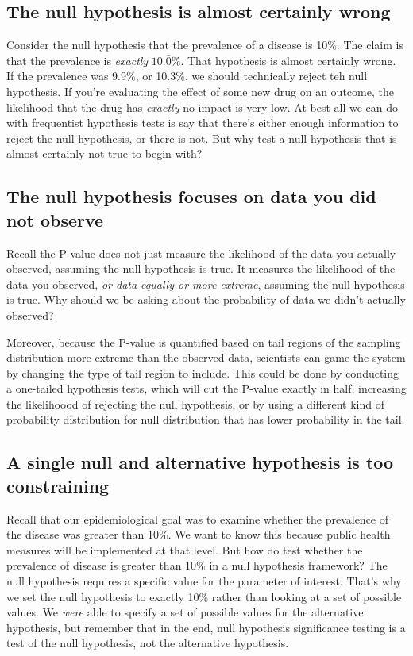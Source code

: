 \documentclass[
]{book}
\begin{document}
\subsection{The null hypothesis is almost certainly wrong}\label{the-null-hypothesis-is-almost-certainly-wrong}

Consider the null hypothesis that the prevalence of a disease is 10\%. The claim is that the prevalence is \emph{exactly} \(10.\bar{0}\%\). That hypothesis is almost certainly wrong. If the prevalence was 9.9\%, or 10.3\%, we should technically reject teh null hypothesis. If you're evaluating the effect of some new drug on an outcome, the likelihood that the drug has \emph{exactly} no impact is very low. At best all we can do with frequentist hypothesis tests is say that there's either enough information to reject the null hypothesis, or there is not. But why test a null hypothesis that is almost certainly not true to begin with?

\subsection{The null hypothesis focuses on data you did not observe}\label{the-null-hypothesis-focuses-on-data-you-did-not-observe}

Recall the P-value does not just measure the likelihood of the data you actually observed, assuming the null hypothesis is true. It measures the likelihood of the data you observed, \emph{or data equally or more extreme}, assuming the null hypothesis is true. Why should we be asking about the probability of data we didn't actually observed?

Moreover, because the P-value is quantified based on tail regions of the sampling distribution more extreme than the observed data, scientists can game the system by changing the type of tail region to include. This could be done by conducting a one-tailed hypothesis tests, which will cut the P-value exactly in half, increasing the likelihoood of rejecting the null hypothesis, or by using a different kind of probability distribution for null distribution that has lower probability in the tail.

\subsection{A single null and alternative hypothesis is too constraining}\label{a-single-null-and-alternative-hypothesis-is-too-constraining}

Recall that our epidemiological goal was to examine whether the prevalence of the disease was greater than 10\%. We want to know this because public health measures will be implemented at that level. But how do test whether the prevalence of disease is greater than 10\% in a null hypothesis framework? The null hypothesis requires a specific value for the parameter of interest. That's why we set the null hypothesis to exactly 10\% rather than looking at a set of possible values. We \emph{were} able to specify a set of possible values for the alternative hypothesis, but remember that in the end, null hypothesis significance testing is a test of the null hypothesis, not the alternative hypothesis.
\end{document}
